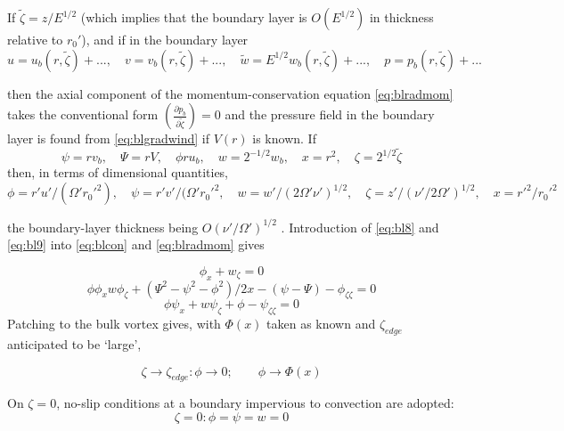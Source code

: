 \documentclass[preprint, prX]{revtex4}
\newcommand{\ppd}[2]{\left(\frac{\partial#1}{\partial#2}\right)}
\begin{document}
If $\tilde{\zeta} = z/E^{1/2}$ (which implies that the boundary layer is $O(E^{1/2} )$ in thickness relative
to $r_0'$), and if in the boundary layer
\begin{equation}
u = u_b(r,\tilde{\zeta})+..., \quad 
v = v_b(r,\tilde{\zeta})+..., \quad 
\tilde{w} = E^{1/2}w_b(r,\tilde{\zeta})+..., \quad 
p = p_b(r,\tilde{\zeta})+... 
\label{eq:bl8}
\end{equation}

then the axial component of the momentum-conservation equation \eqref{eq:blradmom} takes the conventional form $\ppd{p_b}{\tilde{\zeta}}=0$ and the pressure field in the boundary layer is found from \eqref{eq:blgradwind} if $V(r)$ is known. If
\begin{equation}
\psi = r v_b, \quad
\Psi = rV, \quad
\phi r u_b, \quad
w=2^{-1/2} w_b, \quad
x=r^2, \quad
\zeta = 2^{1/2} \tilde{\zeta}
\label{eq:bl9}
\end{equation}
then, in terms of dimensional quantities,
\begin{equation}
\phi = r'u'/(\Omega'r_0'^2), \quad
\psi = r'v'/(\Omega'r_0'^2, \quad
w=w'/(2\Omega'\nu')^{1/2}, \quad
\zeta= z'/(\nu'/2\Omega')^{1/2}, \quad
x = r'^2/r_0'^2
\label{eq:bl10}
\end{equation}

the boundary-layer thickness being $O(\nu'/ \Omega')^{1/2}$ . Introduction of \eqref{eq:bl8} and \eqref{eq:bl9} into \eqref{eq:blcon} and \eqref{eq:blradmom} gives

\begin{equation}
\phi_x + w_\zeta =0
\label{eq:bl11}
\end{equation}
\begin{equation}
\phi \phi_x w \phi_\zeta + (\Psi^2 - \psi^2 - \phi^2)/2x -(\psi - \Psi) - \phi_{\zeta\zeta} = 0
\label{eq:bl12}
\end{equation}
\begin{equation}
\phi \psi_x + w \psi_\zeta + \phi - \psi_{\zeta\zeta}=0
\label{eq:bl13}
\end{equation}
Patching to the bulk vortex gives, with $\Phi(x)$ taken as known and $\zeta_{edge}$ anticipated to be `large',

\begin{equation}
\zeta \rightarrow \zeta_{edge}: \phi \rightarrow 0; \qquad \phi \rightarrow \Phi(x)
\label{eq:bl14}
\end{equation}

On $\zeta =0$, no-slip conditions at a boundary impervious to convection are adopted:
\begin{equation}
\zeta=0:\phi=\psi=w=0
\label{eq:blnonslip}
\end{equation}
\end{document}
